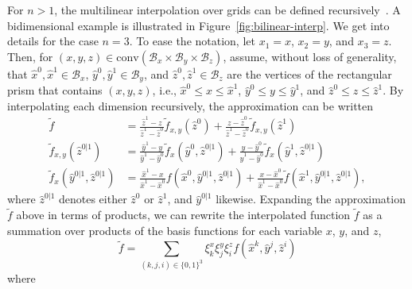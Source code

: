 \documentclass[pdflatex,sn-mathphys-num]{sn-jnl}%
\newcommand{\new}[1]{#1}
\begin{document}
For $n>1$, the multilinear interpolation over grids can be defined recursively~\citep{weiser_note_1988}.
A bidimensional example is illustrated in Figure~\ref{fig:bilinear-interp}.
We get into details for the case $n=3$.
To ease the notation, let $x_1=x$, $x_2=y$, and $x_3=z$.
Then, for $\left( x,y,z \right) \in \text{conv}(\mathcal{B}_x\times \mathcal{B}_y\times \mathcal{B}_z)$, assume, without loss of generality, that $\hat{x}^0,\hat{x}^1\in \mathcal{B}_x$, $\hat{y}^0,\hat{y}^1\in \mathcal{B}_y$, and $\hat{z}^0,\hat{z}^1\in \mathcal{B}_z$ are the vertices of the rectangular prism that contains $\left( x,y,z \right) $, i.e., $\hat{x}^0\le x\le \hat{x}^1$, $\hat{y}^0\le y\le \hat{y}^1$, and  $\hat{z}^0\le z\le \hat{z}^1$.
By interpolating each dimension recursively, the approximation can be written
\begin{equation}\label{eq:trilinear-recursive}
\begin{aligned}
    \widetilde{f} &= \frac{\hat{z}^1-z}{\hat{z}^1-\hat{z}^0}\widetilde{f}_{x,y}\!\left( \hat{z}^0 \right) + \frac{z-\hat{z}^0}{\hat{z}^1-\hat{z}^0}\widetilde{f}_{x,y}\!\left( \hat{z}^1 \right)   \\
    \widetilde{f}_{x,y}\!\left( \hat{z}^{0|1} \right)  &= \frac{\hat{y}^1-y}{\hat{y}^1-\hat{y}^0} \widetilde{f}_x\!\left( \hat{y}^0, \hat{z}^{0|1} \right) + \frac{y-\hat{y}^0}{\hat{y}^1-\hat{y}^0} \widetilde{f}_{x}\!\left( \hat{y}^1,\hat{z}^{0|1} \right)  \\
    \widetilde{f}_{x}\!\left( \hat{y}^{0|1},\hat{z}^{0|1} \right) &= \frac{\hat{x}^1-x}{\hat{x}^1-\hat{x}^0}f\!\left( \hat{x}^0,\hat{y}^{0|1},\hat{z}^{0|1} \right) + \frac{x-\hat{x}^0}{\hat{x}^1-\hat{x}^0} \widetilde{f}\!\left( \hat{x}^1,\hat{y}^{0|1},\hat{z}^{0|1} \right)
,\end{aligned}
\end{equation}
where $\hat{z}^{0|1}$ denotes either $\hat{z}^0$ or $\hat{z}^1$, and $\hat{y}^{0|1}$ likewise.
Expanding the approximation $\widetilde{f}$ above in terms of products, we can rewrite the interpolated function \(\widetilde{f}\) as a summation over products of the basis functions for each variable \( x \), \( y \), and \( z \), 
\begin{equation}
\new{\widetilde{f} = \sum_{(k,j,i)\in\{0,1\}^3} \xi^{x}_k \xi^{y}_j \xi^{z}_i  f(\hat{x}^k, \hat{y}^j, \hat{z}^i)} \label{eq:trilinear-recursive:prod}
\end{equation}
where
\end{document}
